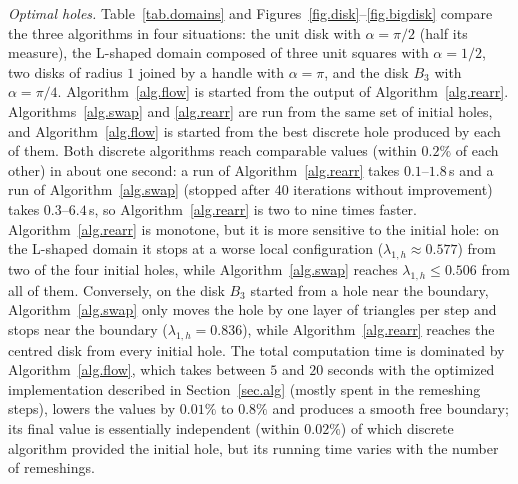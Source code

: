 \documentclass[11pt]{amsart}
\theoremstyle{remark}
\numberwithin{equation}{section}
\begin{document}
\emph{Optimal holes.} Table~\ref{tab.domains} and Figures~\ref{fig.disk}--\ref{fig.bigdisk} compare the three algorithms in four situations: the unit disk with $\alpha=\pi/2$ (half its measure), the L-shaped domain composed of three unit squares with $\alpha=1/2$, two disks of radius $1$ joined by a handle with $\alpha=\pi$, and the disk $B_3$ with $\alpha=\pi/4$. Algorithm~\ref{alg.flow} is started from the output of Algorithm~\ref{alg.rearr}. Algorithms~\ref{alg.swap} and \ref{alg.rearr} are run from the same set of initial holes, and Algorithm~\ref{alg.flow} is started from the best discrete hole produced by each of them. Both discrete algorithms reach comparable values (within $0.2\%$ of each other) in about one second: a run of Algorithm~\ref{alg.rearr} takes $0.1$--$1.8$\,s and a run of Algorithm~\ref{alg.swap} (stopped after 40 iterations without improvement) takes $0.3$--$6.4$\,s, so Algorithm~\ref{alg.rearr} is two to nine times faster. Algorithm~\ref{alg.rearr} is monotone, but it is more sensitive to the initial hole: on the L-shaped domain it stops at a worse local configuration ($\lambda_{1,h}\approx0.577$) from two of the four initial holes, while Algorithm~\ref{alg.swap} reaches $\lambda_{1,h}\le0.506$ from all of them. Conversely, on the disk $B_3$ started from a hole near the boundary, Algorithm~\ref{alg.swap} only moves the hole by one layer of triangles per step and stops near the boundary ($\lambda_{1,h}=0.836$), while Algorithm~\ref{alg.rearr} reaches the centred disk from every initial hole. The total computation time is dominated by Algorithm~\ref{alg.flow}, which takes between $5$ and $20$ seconds with the optimized implementation described in Section~\ref{sec.alg} (mostly spent in the remeshing steps), lowers the values by $0.01\%$ to $0.8\%$ and produces a smooth free boundary; its final value is essentially independent (within $0.02\%$) of which discrete algorithm provided the initial hole, but its running time varies with the number of remeshings.

\begin{table}[h]
\centering\small

\caption{Best values of $\lambda_{1,h}$ over the initial holes (``starts'') obtained by Algorithms~\ref{alg.swap} and \ref{alg.rearr}, with the mean computation time of one run in seconds in parentheses; Algorithm~\ref{alg.swap} is stopped when the best value has not improved during 40 iterations (at most 300 iterations). The last two columns give the value after Algorithm~\ref{alg.flow}, started from the best hole of each discrete algorithm, and in parentheses the total computation time of the chain (discrete algorithm from the best start plus Algorithm~\ref{alg.flow}), in seconds. Initial meshes have between 2000 and 5100 nodes; Algorithm~\ref{alg.flow} uses remeshing near the interface.}\label{tab.domains}
\end{table}
\end{document}

